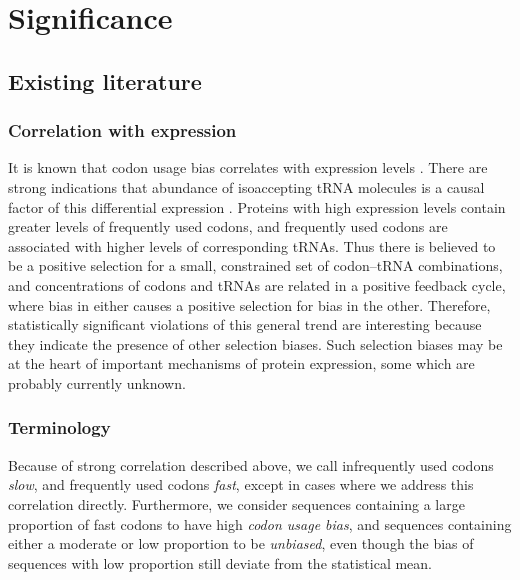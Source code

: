 \documentclass[11pt]{nih}
\begin{document}
\section{Significance}

\subsection{Existing literature}

\subsubsection{Correlation with expression}
It is known that codon usage bias correlates with expression levels \citep{Goetz2005,Gustafsson2004}. There are strong indications that abundance of isoaccepting tRNA molecules is a causal factor of this differential expression \citep{Klumpp2012,Plotkin2011,Najafabadi2007,Tavare1989}. Proteins with high expression levels  contain greater levels of frequently used codons, and frequently used codons are associated with higher levels of corresponding tRNAs. Thus there is believed to be a positive selection for a small, constrained set of codon--tRNA combinations, and concentrations of codons and tRNAs are related in a positive feedback cycle, where bias in either causes a positive selection for bias in the other. Therefore, statistically significant violations of this general trend are interesting because they indicate the presence of other selection biases. Such selection biases may be at the heart of important mechanisms of protein expression, some which are probably currently unknown.

\subsubsection{Terminology}
Because of strong correlation described above, we call infrequently used codons \emph{slow}, and frequently used codons \emph{fast}, except in cases where we address this correlation directly. Furthermore, we consider sequences containing a large proportion of fast codons to have high \emph{codon usage bias}, and sequences containing either a moderate or low proportion to be \emph{unbiased}, even though the bias of sequences with low proportion still deviate from the statistical mean.
\end{document}
